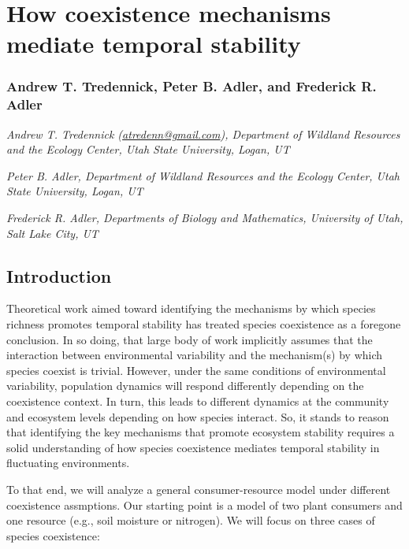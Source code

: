 \documentclass[12pt,]{article}
\author{}
\date{}
\begin{document}
\normalsize


\section{How coexistence mechanisms mediate temporal
stability}\label{how-coexistence-mechanisms-mediate-temporal-stability}

\subsubsection{Andrew T. Tredennick, Peter B. Adler, and Frederick R.
Adler}\label{andrew-t.-tredennick-peter-b.-adler-and-frederick-r.-adler}

\emph{Andrew T. Tredennick
(\href{mailto:atredenn@gmail.com}{\href{mailto:atredenn@gmail.com}{atredenn@gmail.com}}),
Department of Wildland Resources and the Ecology Center, Utah State
University, Logan, UT}

\emph{Peter B. Adler, Department of Wildland Resources and the Ecology
Center, Utah State University, Logan, UT}

\emph{Frederick R. Adler, Departments of Biology and Mathematics,
University of Utah, Salt Lake City, UT}

\subsection{Introduction}\label{introduction}

Theoretical work aimed toward identifying the mechanisms by which
species richness promotes temporal stability has treated species
coexistence as a foregone conclusion. In so doing, that large body of
work implicitly assumes that the interaction between environmental
variability and the mechanism(s) by which species coexist is trivial.
However, under the same conditions of environmental variability,
population dynamics will respond differently depending on the
coexistence context. In turn, this leads to different dynamics at the
community and ecosystem levels depending on how species interact. So, it
stands to reason that identifying the key mechanisms that promote
ecosystem stability requires a solid understanding of how species
coexistence mediates temporal stability in fluctuating environments.

To that end, we will analyze a general consumer-resource model under
different coexistence assmptions. Our starting point is a model of two
plant consumers and one resource (e.g., soil moisture or nitrogen). We
will focus on three cases of species coexistence:
\end{document}
